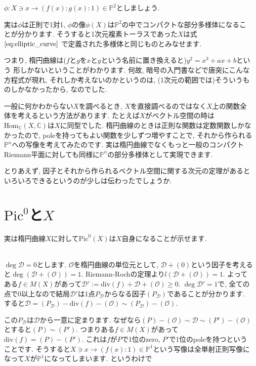 \documentclass{jsarticle}
\def\Hom{\mathrm{Hom}}
\def\Pic{\mathrm{Pic}}
\def\div{\mathrm{div}}
\theoremstyle{definition}
\numberwithin{theorem}{section}
\begin{document}
$\phi: X \ni x \rightarrow (f(x):g(x):1) \in \mathbb{P}^2$としましょう.

実は$\phi$は正則で1対1, $\phi$の像$\phi(X)$は$\mathbb{P}^2$の中でコンパクトな部分多様体になることが分かります. そうすると1次元複素トーラスであった$X$は式 $\ref{eq:elliptic_curve}$ で定義された多様体と同じものとみなせます.

つまり, 楕円曲線は($f$と$g$を$x$と$y$という名前に置き換えると)$y^2 = x^3+ax+b$という
形しかないということがわかります. 何故, 暗号の入門書などで唐突にこんな方程式が現れ, それしか考えないのかというのは, (1次元の範囲では)そういうものしかなかったから, なのでした.

一般に何かわからない$X$を調べるとき, $X$を直接調べるのではなく$X$上の関数全体を考えるという方法があります. たとえば$X$がベクトル空間の時は$\Hom_\mathbb{C}(X, \mathbb{C})$は$X$に同型でした. 楕円曲線のときは正則な関数は定数関数しかなかったので, poleを持ってもよい関数を少しずつ増やすことで, それから作られる$\mathbb{P}^n$への写像を考えてみたのです. 実は楕円曲線でなくもっと一般のコンパクトRiemann平面に対しても同様に$\mathbb{P}^n$の部分多様体として実現できます.

とりあえず, 因子とそれから作られるベクトル空間に関する次元の定理があるといろいろできるというのが少しは伝わったでしょうか.
\newpage
\section{$\Pic^0$と$X$}
実は楕円曲線$X$に対して$\Pic^0(X)$は$X$自身になることが示せます.

\hrulefill\\

$\deg \mathcal{D} = 0$とします. $\mathcal{O}$を楕円曲線の単位元として, $\mathcal{D} + (0)$という因子を考えると$\deg(\mathcal{D} + (\mathcal{O})) = 1$. Riemann-Rochの定理より$l(\mathcal{D} + (\mathcal{O})) = 1$. よってある$f \in M(X)$があって$\mathcal{D}' := \div(f) + \mathcal{D} + (\mathcal{O}) \geq 0$. $\deg \mathcal{D}' = 1$で, 全ての点で0以上なので結局$\mathcal{D}'$は1点$P_\mathcal{D}$からなる因子$(P_\mathcal{D})$であることが分かります. すると$\mathcal{D} = (P_\mathcal{D}) - \div(f) - (\mathcal{O}) \sim (P_\mathcal{D}) - (\mathcal{O})$.

この$P_\mathcal{D}$は$\mathcal{D}$から一意に定まります. なぜなら$(P) - (\mathcal{O}) \sim \mathcal{D} \sim (P') - (\mathcal{O})$とすると$(P)\sim(P')$. つまりある$f\in M(X)$があって$\div(f) = (P) - (P')$. これは$f$が$P$で1位のzero, $P'$で1位のpoleを持つということです. そうすると$X \ni x \rightarrow (f(x):1) \in \mathbb{P}^1$という写像は全単射正則写像になって$X$が$\mathbb{P}^1$になってしまいます. というわけで
\end{document}
